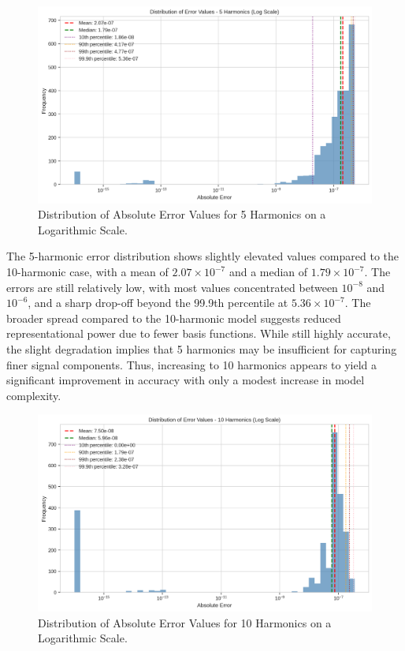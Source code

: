 \documentclass[preprint,12pt]{elsarticle}
\begin{document}
\begin{figure}[t]
    \centering
    \includegraphics[width=0.9\linewidth]{figures/error_distribution_5h.png}
    \caption{Distribution of Absolute Error Values for 5 Harmonics on a Logarithmic Scale.}
    \label{fig:error_dist_5h}
\end{figure}

The 5-harmonic error distribution shows slightly elevated values compared to the 10-harmonic case, with a mean of \(2.07 \times 10^{-7}\) and a median of \(1.79 \times 10^{-7}\). The errors are still relatively low, with most values concentrated between \(10^{-8}\) and \(10^{-6}\), and a sharp drop-off beyond the 99.9th percentile at \(5.36 \times 10^{-7}\). The broader spread compared to the 10-harmonic model suggests reduced representational power due to fewer basis functions. While still highly accurate, the slight degradation implies that 5 harmonics may be insufficient for capturing finer signal components. Thus, increasing to 10 harmonics appears to yield a significant improvement in accuracy with only a modest increase in model complexity.

\begin{figure}[t]
    \centering
    \includegraphics[width=0.9\linewidth]{figures/error_distribution_10h.png}
    \caption{Distribution of Absolute Error Values for 10 Harmonics on a Logarithmic Scale.}
    \label{fig:error_dist_10h}
\end{figure}
\end{document}
